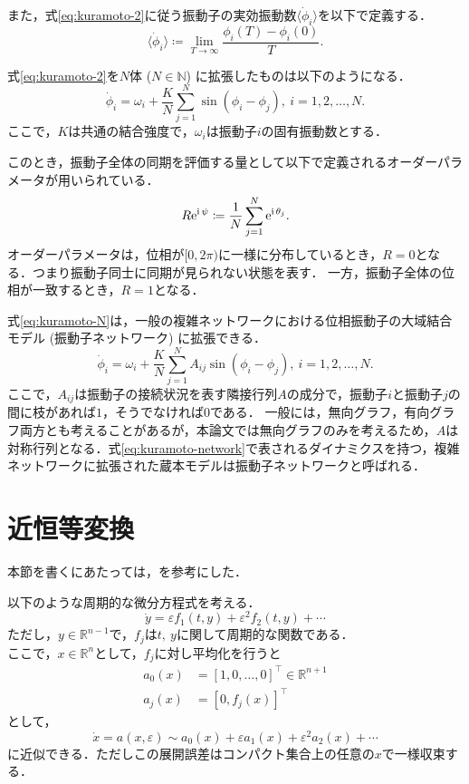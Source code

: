 \documentclass[../main]{subfiles}
\begin{document}
また，式\eqref{eq:kuramoto-2}に従う振動子の実効振動数$\langle\dot{\phi}_i\rangle$を以下で定義する．
\begin{equation}
    \langle\dot{\phi}_i\rangle\coloneqq\lim_{T\to\infty}\frac{\phi_i(T)-\phi_i(0)}{T}.
\end{equation}

式\eqref{eq:kuramoto-2}を$N$体 ($N\in\mathbb{N}$) に拡張したものは以下のようになる．
\begin{equation}
    \label{eq:kuramoto-N}
    \dot{\phi}_i=\omega_i+\frac{K}{N}\sum_{j=1}^N\sin(\phi_i-\phi_j),\ i=1,2,\ldots,N.
\end{equation}
ここで，$K$は共通の結合強度で，$\omega_i$は振動子$i$の固有振動数とする．

このとき，振動子全体の同期を評価する量として以下で定義されるオーダーパラメータが用いられている．
\begin{equation}
    R\mathrm{e}^{{\mathrm i\,} \psi}\coloneqq\frac{1}{N}\sum_{j=1}^N\mathrm{e}^{{\mathrm i\,} \theta_j}.    
\end{equation}
オーダーパラメータは，位相が$[0,2\pi)$に一様に分布しているとき，$R= 0$となる．つまり振動子同士に同期が見られない状態を表す．
一方，振動子全体の位相が一致するとき，$R=1$となる．

式\eqref{eq:kuramoto-N}は，一般の複雑ネットワークにおける位相振動子の大域結合モデル (振動子ネットワーク) に拡張できる．
\begin{equation}
    \label{eq:kuramoto-network}
    \dot{\phi}_i=\omega_i+\frac{K}{N}\sum_{j=1}^NA_{ij}\sin(\phi_i-\phi_j),\ i=1,2,\ldots,N.
\end{equation}
ここで，$A_{ij}$は振動子の接続状況を表す隣接行列$A$の成分で，振動子$i$と振動子$j$の間に枝があれば$1$，そうでなければ$0$である．
一般には，無向グラフ，有向グラフ両方とも考えることがあるが，本論文では無向グラフのみを考えるため，$A$は対称行列となる．式\eqref{eq:kuramoto-network}で表されるダイナミクスを持つ，複雑ネットワークに拡張された蔵本モデルは振動子ネットワークと呼ばれる．
\section{近恒等変換}
本節を書くにあたっては，\cite{james2003}を参考にした．

以下のような周期的な微分方程式を考える．
\begin{equation}
    \dot{y}=\varepsilon f_1(t,y)+\varepsilon^2f_2(t,y)+\cdots
\end{equation}
ただし，$y\in\mathbb{R}^{n-1}$で，$f_j$は$t,\ y$に関して周期的な関数である．\\
ここで，$x\in\mathbb{R}^{n}$として，$f_j$に対し平均化を行うと
\begin{align}
    a_0(x)&=[1,0,\ldots,0]^\top\in\mathbb{R}^{n+1}\\
    a_j(x)&=[0,f_j(x)]^\top
\end{align}
として，
\begin{equation}
    \dot{x}=a(x,\varepsilon)\sim a_0(x)+\varepsilon a_1(x)+\varepsilon^2 a_2(x)+\cdots
\end{equation}
に近似できる．ただしこの展開誤差はコンパクト集合上の任意の$x$で一様収束する．
\end{document}
